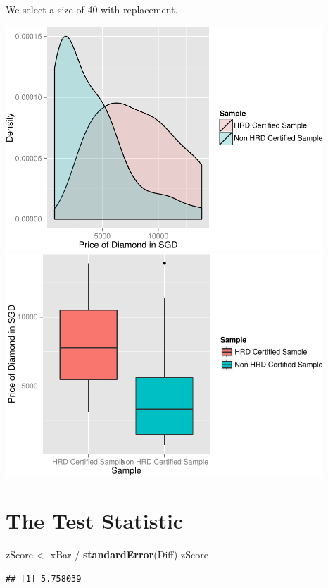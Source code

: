 \documentclass[]{article}
\newenvironment{Shaded}{\begin{snugshade}}{\end{snugshade}}
\newcommand{\KeywordTok}[1]{\textcolor[rgb]{0.13,0.29,0.53}{\textbf{{#1}}}}
\newcommand{\StringTok}[1]{\textcolor[rgb]{0.31,0.60,0.02}{{#1}}}
\newcommand{\NormalTok}[1]{{#1}}
\begin{document}
We select a size of 40 with replacement.

\includegraphics[width=450px]{DiamondHypothesis_files/figure-latex/vizualize-1}
\includegraphics[width=450px]{DiamondHypothesis_files/figure-latex/vizualize-2}

\section{The Test Statistic}\label{the-test-statistic}

\begin{Shaded}
\begin{Highlighting}[]
\NormalTok{zScore <-}\StringTok{ }\NormalTok{xBar /}\StringTok{ }\KeywordTok{standardError}\NormalTok{(Diff)}
\NormalTok{zScore}
\end{Highlighting}
\end{Shaded}

\begin{verbatim}
## [1] 5.758039
\end{verbatim}
\end{document}
